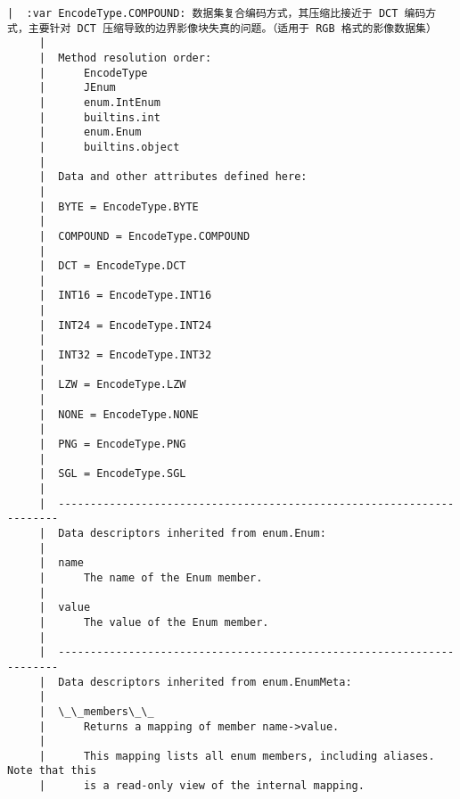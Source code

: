 \documentclass[11pt]{article}
\begin{document}
\begin{Verbatim}[commandchars=\\\{\}]
     |  :var EncodeType.COMPOUND: 数据集复合编码方式，其压缩比接近于 DCT 编码方式，主要针对 DCT 压缩导致的边界影像块失真的问题。（适用于 RGB 格式的影像数据集）
     |  
     |  Method resolution order:
     |      EncodeType
     |      JEnum
     |      enum.IntEnum
     |      builtins.int
     |      enum.Enum
     |      builtins.object
     |  
     |  Data and other attributes defined here:
     |  
     |  BYTE = EncodeType.BYTE
     |  
     |  COMPOUND = EncodeType.COMPOUND
     |  
     |  DCT = EncodeType.DCT
     |  
     |  INT16 = EncodeType.INT16
     |  
     |  INT24 = EncodeType.INT24
     |  
     |  INT32 = EncodeType.INT32
     |  
     |  LZW = EncodeType.LZW
     |  
     |  NONE = EncodeType.NONE
     |  
     |  PNG = EncodeType.PNG
     |  
     |  SGL = EncodeType.SGL
     |  
     |  ----------------------------------------------------------------------
     |  Data descriptors inherited from enum.Enum:
     |  
     |  name
     |      The name of the Enum member.
     |  
     |  value
     |      The value of the Enum member.
     |  
     |  ----------------------------------------------------------------------
     |  Data descriptors inherited from enum.EnumMeta:
     |  
     |  \_\_members\_\_
     |      Returns a mapping of member name->value.
     |      
     |      This mapping lists all enum members, including aliases. Note that this
     |      is a read-only view of the internal mapping.
    

\end{Verbatim}
\end{document}

